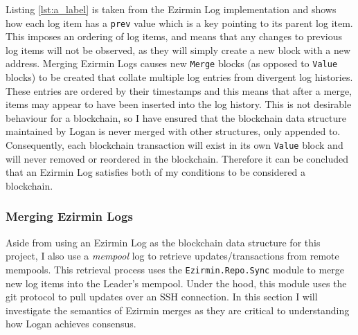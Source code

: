 \documentclass[12pt,a4paper,twoside,openright]{report}
\begin{document}
	Listing \ref{lst:a_label} is taken from the Ezirmin Log implementation and shows how each log item has a \texttt{prev} value which is a key pointing to its parent log item. 
	This imposes an ordering of log items, and means that any changes to previous log items will not be observed, as they will simply create a new block with a new address. 
	Merging Ezirmin Logs causes new \texttt{Merge} blocks (as opposed to \texttt{Value} blocks) to be created that collate multiple log entries from divergent log histories.
	These entries are ordered by their timestamps and this means that after a merge, items may appear to have been inserted into the log history.
	This is not desirable behaviour for a blockchain, so I have ensured that the blockchain data structure maintained by Logan is never merged with other structures, only appended to. 
	Consequently, each blockchain transaction will exist in its own \texttt{Value} block and will never removed or reordered in the blockchain.
	Therefore it can be concluded that an Ezirmin Log satisfies both of my conditions to be considered a blockchain.

	\subsubsection*{Merging Ezirmin Logs}
	Aside from using an Ezirmin Log as the blockchain data structure for this project, I also use a \textit{mempool} log to retrieve updates/transactions from remote mempools. 
	This retrieval process uses the \texttt{Ezirmin.Repo.Sync} module to merge new log items into the Leader's mempool.
	Under the hood, this module uses the git protocol to pull updates over an SSH connection.
	In this section I will investigate the semantics of Ezirmin merges as they are critical to understanding how Logan achieves consensus.\\
	
\end{document}
